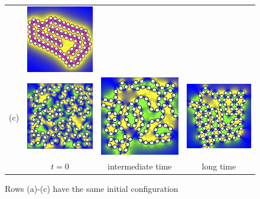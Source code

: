 \begin{figure}[h!]
\begin{center}
\begin{tabular}{m{0.1cm}m{1.8in}m{1.8in}m{1.8in}}
      &\includegraphics[width=1.8in]{figures/SpecificAim1/N100C3.jpg}    \\
    (c)
      &\includegraphics[width=1.8in]{figures/SpecificAim1/N100A1.jpg}
      &\includegraphics[width=1.8in]{figures/SpecificAim1/N100A2.jpg}
      &\includegraphics[width=1.8in]{figures/SpecificAim1/N100A3.jpg}    \\
      &\multicolumn{1}{c}{$t = 0$}
      &\multicolumn{1}{c}{intermediate time}
      &\multicolumn{1}{c}{long time}
  \end{tabular}
  \end{center}
  \vspace{-20pt}
  \caption{\footnotesize
    \label{fig:self-assembly}
    Rows (a)-(c) have the same initial configuration
}
\end{figure}
